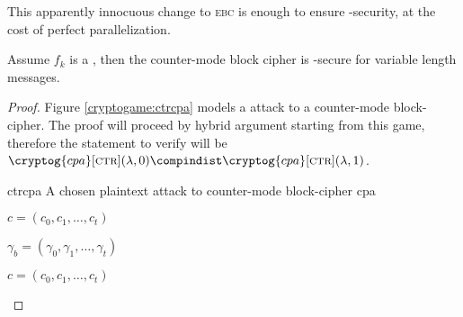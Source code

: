 This apparently innocuous change to \textsc{ebc} is enough to ensure \cpa-security, at the cost of perfect parallelization.

\begin{theorem}
    Assume $f_k$ is a \prf, then the counter-mode block cipher is \cpa-secure for variable length messages\footnotemark.
\end{theorem}

\begin{proof}
    Figure \ref{cryptogame:ctrcpa} models a \cpa{} attack to a counter-mode block-cipher. The proof will proceed by hybrid argument starting from this game, therefore the statement to verify will be $\cryptog{cpa}[\textsc{ctr}](\lambda, 0) \compindist \cryptog{cpa}[\textsc{ctr}](\lambda, 1)$.

    \begin{cryptogame}
        {ctrcpa}
        {A chosen plaintext attack to counter-mode block-cipher}
        {cpa}
        
        \cseqbeginloop

        {$c = (c_0, c_1, \dots, c_t)$}{}

        \cseqendloop

        \cseqdelay
        
        {$\gamma_b = (\gamma_0, \gamma_1, \dots, \gamma_t)$}{}

        \cseqdelay
        
        \cseqbeginloop

        {$c = (c_0, c_1, \dots, c_t)$}{}


\end{cryptogame}
\end{proof}
